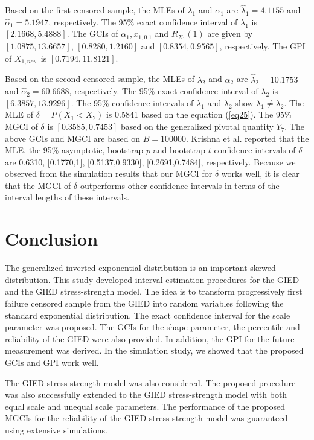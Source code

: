 \documentclass[12pt]{article}
\begin{document}
Based on the first censored sample, the MLEs of $\lambda_1$ and $\alpha_1$ are $\widehat{\lambda}_1=4.1155$ and $\widehat{\alpha}_1=5.1947$, respectively. The 95\% exact confidence interval of $\lambda_1$ is $[2.1668, 5.4888]$. The GCIs of $\alpha_1, x_{1,0.1}$ and $R_{X_1}(1)$ are given by $[1.0875, 13.6657]$, $[0.8280, 1.2160]$ and $[0.8354, 0.9565]$, respectively. The GPI of $X_{1,new}$ is $[0.7194, 11.8121]$.

Based on the second censored sample, the MLEs of $\lambda_2$ and $\alpha_2$ are $\widehat{\lambda}_2=10.1753$ and $\widehat{\alpha}_2=60.6688$, respectively. The 95\% exact confidence interval of $\lambda_2$ is $[6.3857, 13.9296]$. The 95\% confidence intervals of $\lambda_1$ and $\lambda_2$ show $\lambda_1 \neq \lambda_2$. The MLE of $\delta=P(X_1<X_2)$ is 0.5841 based on the equation (\ref{eq25}). The 95\% MGCI of $\delta$ is $[0.3585,    0.7453]$ based on the generalized pivotal quantity $Y_7$. The above GCIs and MGCI are based on $B=100000$. Krishna et al. \cite{krishna2017estimation} reported that the MLE, the 95\% asymptotic, bootstrap-$p$ and bootstrap-$t$ confidence intervals of $\delta$ are 0.6310, [0.1770,1], [0.5137,0.9330], [0.2691,0.7484], respectively. Because we observed from the simulation results that our MGCI for $\delta$ works well,
it is clear that the MGCI of $\delta$ outperforms other confidence intervals in terms of the interval lengths of these intervals.

\section{Conclusion}
The generalized inverted exponential distribution is an important skewed distribution. This study developed interval estimation procedures for the GIED and the GIED stress-strength model. The idea is to transform progressively first failure censored sample from the GIED into random variables following the standard exponential distribution. The exact confidence interval for the scale parameter was proposed. The GCIs for the shape parameter, the percentile and reliability of the GIED were also provided. In addition, the GPI for the future measurement was derived. In the simulation study, we showed that the proposed GCIs and GPI work well.

The GIED stress-strength model was also considered. The proposed procedure was also successfully extended to the GIED stress-strength model with both equal scale and unequal scale parameters. The performance of the proposed MGCIs for the reliability of the GIED stress-strength model was guaranteed using extensive simulations.














%

\end{document}
